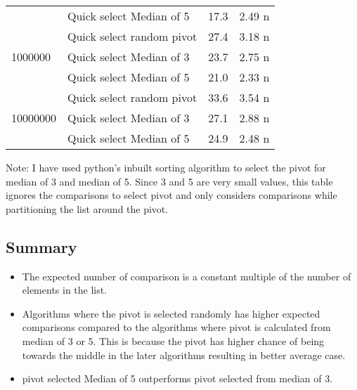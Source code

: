 \documentclass{homeworg}
\begin{document}
\begin{table}[htbp]
\begin{tabular}{llrr}
       & Quick select Median of 5 &                 17.3 &               2.49 n \\
\cline{1-4}
\multirow{3}{*}{1000000} & Quick select random pivot &                 27.4 &               3.18 n \\
        & Quick select Median of 3 &                 23.7 &               2.75 n \\
        & Quick select Median of 5 &                 21.0 &               2.33 n \\
\cline{1-4}
\multirow{3}{*}{10000000} & Quick select random pivot &                 33.6 &               3.54 n \\
         & Quick select Median of 3 &                 27.1 &               2.88 n \\
         & Quick select Median of 5 &                 24.9 &               2.48 n \\

\bottomrule
\end{tabular}
\end{table}
Note: I have used python's inbuilt sorting algorithm to select the pivot for median of 3 and median of 5. Since 3 and 5 are very small values, this table ignores the comparisons to select pivot and only considers comparisons while partitioning the list around the pivot. 

\subsection{Summary}
\begin{itemize}
    \item The expected number of comparison is a constant multiple of the number of elements in the list.
    \item Algorithms where the pivot is selected randomly has higher expected comparisons compared to the algorithms where pivot is calculated from median of 3 or 5. This is because the pivot has higher chance of being towards the middle in the later algorithms resulting in better average case.
    \item pivot selected Median of 5 outperforms pivot selected from median of 3. 
\end{itemize}
\end{document}
